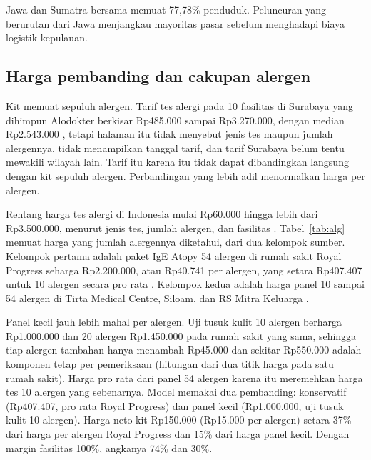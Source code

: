 \documentclass[11pt,a4paper]{article}
\begin{document}
Jawa dan Sumatra bersama memuat 77,78\% penduduk. Peluncuran yang berurutan dari Jawa menjangkau mayoritas pasar sebelum menghadapi biaya logistik kepulauan.

\subsection{Harga pembanding dan cakupan alergen}

Kit memuat sepuluh alergen. Tarif tes alergi pada 10 fasilitas di Surabaya yang dihimpun Alodokter berkisar Rp485.000 sampai Rp3.270.000, dengan median Rp2.543.000 \cite{alodokter}, tetapi halaman itu tidak menyebut jenis tes maupun jumlah alergennya, tidak menampilkan tanggal tarif, dan tarif Surabaya belum tentu mewakili wilayah lain. Tarif itu karena itu tidak dapat dibandingkan langsung dengan kit sepuluh alergen. Perbandingan yang lebih adil menormalkan harga per alergen.

Rentang harga tes alergi di Indonesia mulai Rp60.000 hingga lebih dari Rp3.500.000, menurut jenis tes, jumlah alergen, dan fasilitas \cite{tim}. Tabel~\ref{tab:alg} memuat harga yang jumlah alergennya diketahui, dari dua kelompok sumber. Kelompok pertama adalah paket IgE Atopy 54 alergen di rumah sakit Royal Progress seharga Rp2.200.000, atau Rp40.741 per alergen, yang setara Rp407.407 untuk 10 alergen secara pro rata \cite{royal}. Kelompok kedua adalah harga panel 10 sampai 54 alergen di Tirta Medical Centre, Siloam, dan RS Mitra Keluarga \cite{tim}.

Panel kecil jauh lebih mahal per alergen. Uji tusuk kulit 10 alergen berharga Rp1.000.000 dan 20 alergen Rp1.450.000 pada rumah sakit yang sama, sehingga tiap alergen tambahan hanya menambah Rp45.000 dan sekitar Rp550.000 adalah komponen tetap per pemeriksaan (hitungan dari dua titik harga pada satu rumah sakit). Harga pro rata dari panel 54 alergen karena itu meremehkan harga tes 10 alergen yang sebenarnya. Model memakai dua pembanding: konservatif (Rp407.407, pro rata Royal Progress) dan panel kecil (Rp1.000.000, uji tusuk kulit 10 alergen). Harga neto kit Rp150.000 (Rp15.000 per alergen) setara 37\% dari harga per alergen Royal Progress dan 15\% dari harga panel kecil. Dengan margin fasilitas 100\%, angkanya 74\% dan 30\%.
\end{document}
